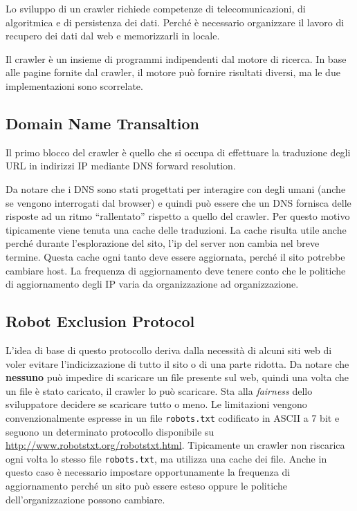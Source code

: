 

Lo sviluppo di un crawler richiede competenze di telecomunicazioni, di algoritmica e di persistenza dei dati. Perché è necessario organizzare il lavoro di recupero dei dati dal web e memorizzarli in locale.

Il crawler è un insieme di programmi indipendenti dal motore di ricerca. In base alle pagine fornite dal crawler, il motore può fornire risultati diversi, ma le due implementazioni sono scorrelate.

\subsection{Domain Name Transaltion}

Il primo blocco del crawler è quello che si occupa di effettuare la traduzione degli URL in indirizzi IP mediante DNS forward resolution.

Da notare che i DNS sono stati progettati per interagire con degli umani (anche se vengono interrogati dal browser) e quindi può essere che un DNS fornisca delle risposte ad un ritmo ``rallentato'' rispetto a quello del crawler. Per questo motivo tipicamente viene tenuta una cache delle traduzioni.
La cache risulta utile anche perché durante l'esplorazione del sito, l'ip del server non cambia nel breve termine. 
Questa cache ogni tanto deve essere aggiornata, perché il sito potrebbe cambiare host. La frequenza di aggiornamento deve tenere conto che le politiche di aggiornamento degli IP varia da organizzazione ad organizzazione.

\subsection{Robot Exclusion Protocol}

L'idea di base di questo protocollo deriva dalla necessità di alcuni siti web di voler evitare l'indicizzazione di tutto il sito o di una parte ridotta.
Da notare che \textbf{nessuno} può impedire di scaricare un file presente sul web, quindi una volta che un file è stato caricato, il crawler lo può scaricare. Sta alla \textit{fairness} dello sviluppatore decidere se scaricare tutto o meno.
Le limitazioni vengono convenzionalmente espresse in un file \texttt{robots.txt} codificato in ASCII a 7 bit e seguono un determinato protocollo disponibile su \url{http://www.robotstxt.org/robotstxt.html}.
Tipicamente un crawler non riscarica ogni volta lo stesso file \texttt{robots.txt}, ma utilizza una cache dei file.
Anche in questo caso è necessario impostare opportunamente la frequenza di aggiornamento perché un sito può essere esteso oppure le politiche dell'organizzazione possono cambiare.

